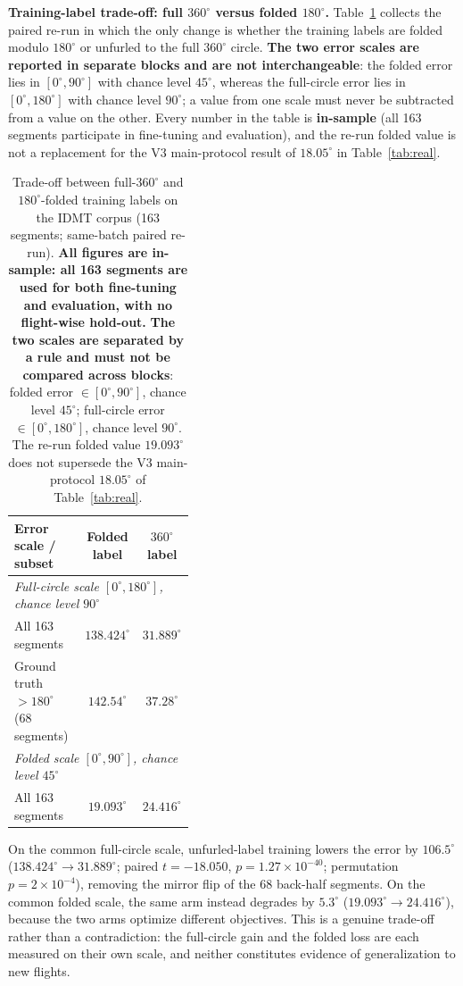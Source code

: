 \documentclass[sensors,article,submit,pdftex,moreauthors]{Definitions/mdpi}
\begin{document}
\textbf{Training-label trade-off: full $360^\circ$ versus folded $180^\circ$.} Table~\ref{tab:label_tradeoff} collects the paired re-run in which the only change is whether the training labels are folded modulo $180^\circ$ or unfurled to the full $360^\circ$ circle. \textbf{The two error scales are reported in separate blocks and are not interchangeable}: the folded error lies in $[0^\circ,90^\circ]$ with chance level $45^\circ$, whereas the full-circle error lies in $[0^\circ,180^\circ]$ with chance level $90^\circ$; a value from one scale must never be subtracted from a value on the other. Every number in the table is \textbf{in-sample} (all 163 segments participate in fine-tuning and evaluation), and the re-run folded value is not a replacement for the V3 main-protocol result of $18.05^\circ$ in Table~\ref{tab:real}.

\begin{table}[H]
\renewcommand{\arraystretch}{1.2}
\centering
\caption{Trade-off between full-$360^\circ$ and $180^\circ$-folded training labels on the IDMT corpus (163 segments; same-batch paired re-run). \textbf{All figures are in-sample: all 163 segments are used for both fine-tuning and evaluation, with no flight-wise hold-out.} \textbf{The two scales are separated by a rule and must not be compared across blocks}: folded error $\in[0^\circ,90^\circ]$, chance level $45^\circ$; full-circle error $\in[0^\circ,180^\circ]$, chance level $90^\circ$. The re-run folded value $19.093^\circ$ does not supersede the V3 main-protocol $18.05^\circ$ of Table~\ref{tab:real}.}
\label{tab:label_tradeoff}
\small
\setlength{\tabcolsep}{4pt}
\begin{tabular}{p{0.40\linewidth}cc}
\toprule
Error scale / subset & Folded label & $360^\circ$ label \\
\midrule
\multicolumn{3}{l}{\textit{Full-circle scale $[0^\circ,180^\circ]$, chance level $90^\circ$}} \\
All 163 segments & $138.424^\circ$ & $31.889^\circ$ \\
Ground truth $>180^\circ$ (68 segments) & $142.54^\circ$ & $37.28^\circ$ \\
\midrule
\multicolumn{3}{l}{\textit{Folded scale $[0^\circ,90^\circ]$, chance level $45^\circ$}} \\
All 163 segments & $19.093^\circ$ & $24.416^\circ$ \\
\bottomrule
\end{tabular}
\end{table}

On the common full-circle scale, unfurled-label training lowers the error by $106.5^\circ$ ($138.424^\circ\to31.889^\circ$; paired $t=-18.050$, $p=1.27\times10^{-40}$; permutation $p=2\times10^{-4}$), removing the mirror flip of the 68 back-half segments. On the common folded scale, the same arm instead degrades by $5.3^\circ$ ($19.093^\circ\to24.416^\circ$), because the two arms optimize different objectives. This is a genuine trade-off rather than a contradiction: the full-circle gain and the folded loss are each measured on their own scale, and neither constitutes evidence of generalization to new flights.
\end{document}
